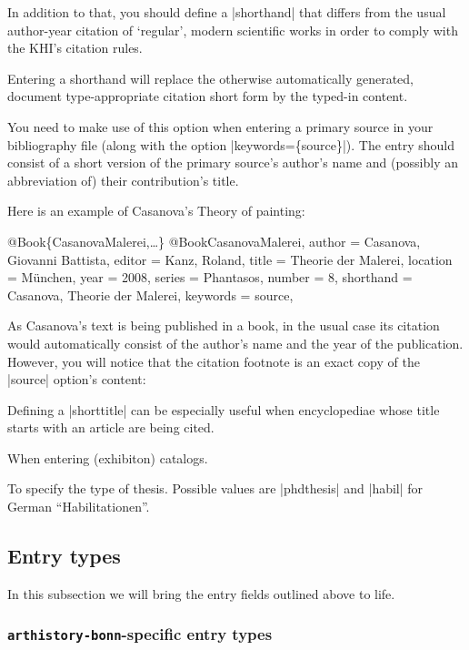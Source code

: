 \documentclass[a4paper,
10pt,
ngerman,
english
]{ltxdoc}
\begin{document}
In addition to that, you should define a |shorthand| that differs from the usual author-year citation of \enquote*{regular}, modern scientific works in order to comply with the KHI's citation rules.

\label{sec:shorthand}
Entering a shorthand will replace the otherwise automatically generated, document type-appropriate citation short form by the typed-in content.

You need to make use of this option when entering a primary source in your bibliography file (along with the option |keywords=\{source\}|). The entry should consist of a short version of the primary source's author's name and (possibly an abbreviation of) their contribution's title.

Here is an example of Casanova's Theory of painting:
\begin{bibexample}[label=CasanovaMalerei]{{@}Book\{CasanovaMalerei,…\}}
@Book{CasanovaMalerei,
  author    = {Casanova, Giovanni Battista},
  editor    = {Kanz, Roland},
  title     = {Theorie der Malerei},
  location  = {München},
  year      = {2008},
  series    = {Phantasos},
  number    = {8},
  shorthand = {Casanova, Theorie der Malerei},
  keywords  = {source},
}
\end{bibexample}
As Casanova's text is being published in a book, in the usual case its citation would automatically consist of the author's name and the year of the publication.
However, you will notice that the citation footnote is an exact copy of the |source| option's content:

Defining a |shorttitle| can be especially useful when encyclopediae whose title starts with an article are being cited.

When entering (exhibiton) catalogs.

To specify the type of thesis. Possible values are |phdthesis| and |habil| for German \foreignquote{ngerman}{Habilitationen}.


\subsection{Entry types}

In this subsection we will bring the entry fields outlined above to life.

\subsubsection{\texttt{arthistory-bonn}-specific entry types}\label{sec:arth-etypes}
\end{document}
